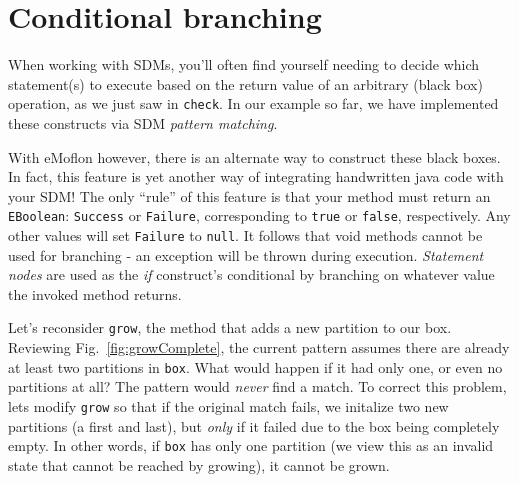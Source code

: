 \newpage
\hypertarget{sec:conBran}{}
\section{Conditional branching}
\genHeader

When working with SDMs, you'll often find yourself needing to decide which statement(s) to execute based on the return value of an arbitrary (black box)
operation, as we just saw in \texttt{check}. In our example so far, we have implemented these constructs via SDM \emph{pattern matching}. 

With eMoflon however, there is an alternate way to construct these black boxes. In fact, this feature is yet another way of integrating handwritten java code
with your SDM! The only ``rule'' of this feature is that your method must return an \texttt{EBoolean}: \texttt{Success} or \texttt{Failure}, 
corresponding to \texttt{true} or \texttt{false}, respectively. Any other values will set \texttt{Failure} to \texttt{null}. It follows that void methods cannot
be used for branching - an exception will be thrown during execution. \emph{Statement nodes} are used as the \emph{if} construct's conditional by branching on
whatever value the invoked method returns.

Let's reconsider \texttt{grow}, the method that adds a new partition to our box. Reviewing Fig.~\ref{fig:growComplete}, the current pattern assumes
there are already at least two partitions in \texttt{box}. What would happen if it had only one, or even no partitions at all? The pattern would \emph{never}
find a match. To correct this problem, lets modify \texttt{grow} so that if the original match fails, we initalize two new partitions (a first and last), but
\emph{only} if it failed due to the box being completely empty. In other words, if \texttt{box} has only one partition (we view this as an invalid state that
cannot be reached by growing), it cannot be grown.





